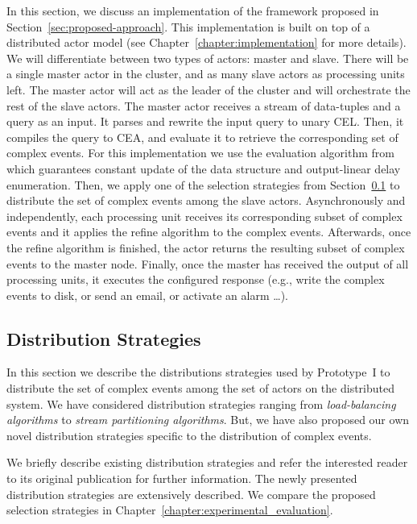 In this section, we discuss an implementation of the framework proposed in Section~\ref{sec:proposed-approach}. This implementation is built on top of a distributed actor model (see Chapter~\ref{chapter:implementation} for more details). We will differentiate between two types of actors: master and slave. There will be a single master actor in the cluster, and as many slave actors as processing units left. The master actor will act as the leader of the cluster and will orchestrate the rest of the slave actors. The master actor receives a stream of data-tuples and a query as an input. It parses and rewrite the input query to unary CEL. Then, it compiles the query to CEA, and evaluate it to retrieve the corresponding set of complex events. For this implementation we use the evaluation algorithm from \cite{formal-framework-cer} which guarantees constant update of the data structure and output-linear delay enumeration. Then, we apply one of the selection strategies from Section~\ref{subsec:distribution-strategies} to distribute the set of complex events among the slave actors. Asynchronously and independently, each processing unit receives its corresponding subset of complex events and it applies the refine algorithm to the complex events. Afterwards, once the refine algorithm is finished, the actor returns the resulting subset of complex events to the master node. Finally, once the master has received the output of all processing units, it executes the configured response (e.g., write the complex events to disk, or send an email, or activate an alarm \ldots).

\subsection{Distribution Strategies}\label{subsec:distribution-strategies}

In this section we describe the distributions strategies used by Prototype~I to distribute the set of complex events among the set of actors on the distributed system. We have considered distribution strategies ranging from \emph{load-balancing algorithms} to \emph{stream partitioning algorithms}. But, we have also proposed our own novel distribution strategies specific to the distribution of complex events.

We briefly describe existing distribution strategies and refer the interested reader to its original publication for further information. The newly presented distribution strategies are extensively described. We compare the proposed selection strategies in Chapter~\ref{chapter:experimental_evaluation}.

